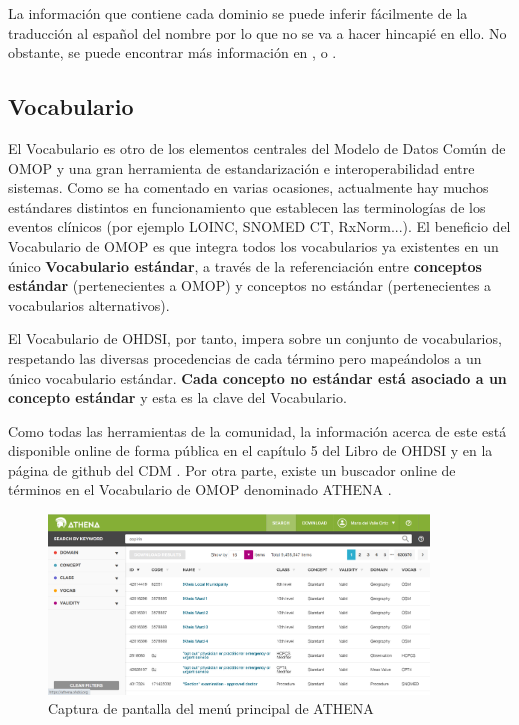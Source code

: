 La información que contiene cada dominio se puede inferir fácilmente de la traducción al español del nombre por lo que no se va a hacer hincapié en ello. No obstante, se puede encontrar más información en \cite{OHDSIbook}, \cite{gitPagesCMD} o \cite{CDMinteractive}.

\subsection{Vocabulario}\label{subsec:07vocab}

El Vocabulario es otro de los elementos centrales del Modelo de Datos Común de OMOP y una gran herramienta de estandarización e interoperabilidad entre sistemas. Como se ha comentado en varias ocasiones, actualmente hay muchos estándares distintos en funcionamiento que establecen las terminologías de los eventos clínicos (por ejemplo LOINC, SNOMED CT, RxNorm...). El beneficio del Vocabulario de OMOP es que integra todos los vocabularios ya existentes en un único \textbf{Vocabulario estándar}, a través de la referenciación entre \textbf{conceptos estándar} (pertenecientes a OMOP) y conceptos no estándar (pertenecientes a vocabularios alternativos).

El Vocabulario de OHDSI, por tanto, impera sobre un conjunto de vocabularios, respetando las diversas procedencias de cada término pero mapeándolos a un único vocabulario estándar. \textbf{Cada concepto no estándar está asociado a un concepto estándar} y esta es la clave del Vocabulario. 

Como todas las herramientas de la comunidad, la información acerca de este está disponible online de forma pública en el capítulo 5 del Libro de OHDSI \cite{OHDSIbook} y en la página de github del CDM \cite{gitPagesCMD}. Por otra parte, existe un buscador online de términos en el Vocabulario de OMOP denominado ATHENA \cite{ATHENAweb}. 

\begin{figure}[H]
\centering
\includegraphics[width=0.90\textwidth]{figures/ATHENAcap.png}
     \caption{Captura de pantalla del menú principal de ATHENA}
    \label{fig:ATHENAcap}
\end{figure}

